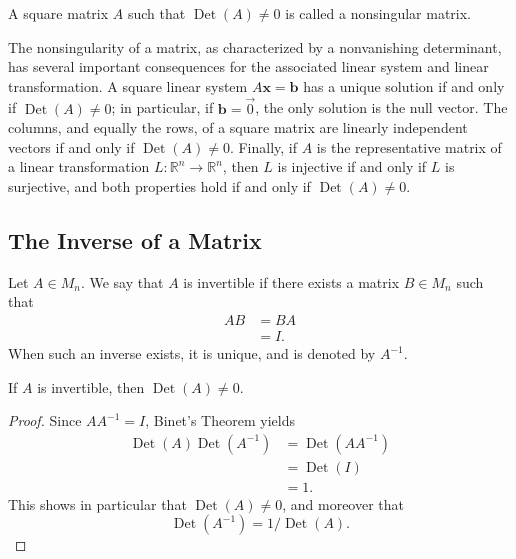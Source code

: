 \begin{definition}
A square matrix $A$ such that $\operatorname{Det}(A) \neq 0$ is called a nonsingular matrix.
\end{definition}

The nonsingularity of a matrix, as characterized by a nonvanishing determinant, has several important consequences for the associated linear system and linear transformation. A square linear system $A\mathbf{x} = \mathbf{b}$ has a unique solution if and only if $\operatorname{Det}(A) \neq 0$; in particular, if $\mathbf{b} = \vec{0}$, the only solution is the null vector. The columns, and equally the rows, of a square matrix are linearly independent vectors if and only if $\operatorname{Det}(A) \neq 0$. Finally, if $A$ is the representative matrix of a linear transformation $L : \mathbb{R}^n \to \mathbb{R}^n$, then $L$ is injective if and only if $L$ is surjective, and both properties hold if and only if $\operatorname{Det}(A) \neq 0$.



\subsection{The Inverse of a Matrix}

\begin{definition}
Let $A \in M_n$. We say that $A$ is invertible if there exists a matrix $B \in M_n$ such that
\[
\begin{aligned}
AB &= BA \\
&= I.
\end{aligned}
\]
When such an inverse exists, it is unique, and is denoted by $A^{-1}$.
\end{definition}

\begin{theorem}
If $A$ is invertible, then $\operatorname{Det}(A) \neq 0$.
\end{theorem}

\begin{proof}
Since $A A^{-1} = I$, Binet's Theorem yields
\[
\begin{aligned}
\operatorname{Det}(A) \operatorname{Det}(A^{-1}) &= \operatorname{Det}(AA^{-1}) \\
&= \operatorname{Det}(I) \\
&= 1.
\end{aligned}
\]
This shows in particular that $\operatorname{Det}(A) \neq 0$, and moreover that
\[
\operatorname{Det}(A^{-1}) = 1/\operatorname{Det}(A).
\]

\end{proof}

